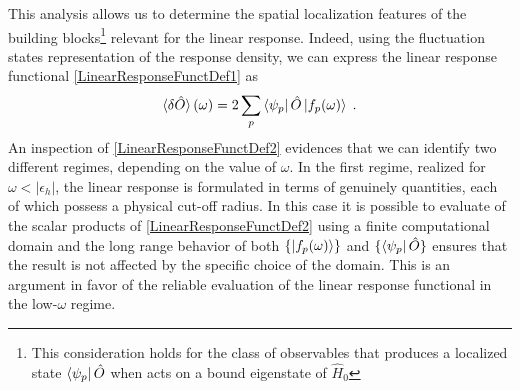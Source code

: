 \documentclass[reprint,aps,prb]{revtex4-1}
\newcommand{\eps}{\epsilon}
\newcommand{\be}{\begin{equation}}
\newcommand{\ee}{\end{equation}}
\newcommand{\lb}{\label}
\newcommand{\op}[1]{\hat {#1}}
\newcommand{\hnot}{\op{H}_0}
\begin{document}
This analysis allows us to determine the spatial localization features of the building blocks\footnote{This consideration holds for the class of observables that produces a localized state 
$\bra{\psi_p}\op O$ when acts on a bound eigenstate of $\hnot$} relevant for the linear response.  
Indeed, using the fluctuation states representation of the response density, we can express the linear response functional \eqref{LinearResponseFunctDef1} as
\be\lb{LinearResponseFunctDef2}
\braket{\delta\op O}(\omega) = 2\sum_p \bra{\psi_p}\op O\ket{f_p(\omega)} \;.
\ee
An inspection of \eqref{LinearResponseFunctDef2} evidences that we can identify two different regimes, depending on the value of $\omega$. In the first regime, realized for $\omega<|\eps_h|$, 
the linear response is formulated in terms of genuinely quantities, each of which possess a physical cut-off radius. In this case it is possible to evaluate of the scalar products of 
\eqref{LinearResponseFunctDef2} using a finite computational domain and the long range behavior of both $\{\ket{f_p(\omega)}\}$ and $\{\bra{\psi_p}\op O\}$ ensures that the result is not 
affected by the specific choice of the domain. This is an argument in favor of the reliable evaluation of the linear response functional in the low-$\omega$ regime.    
\end{document}
